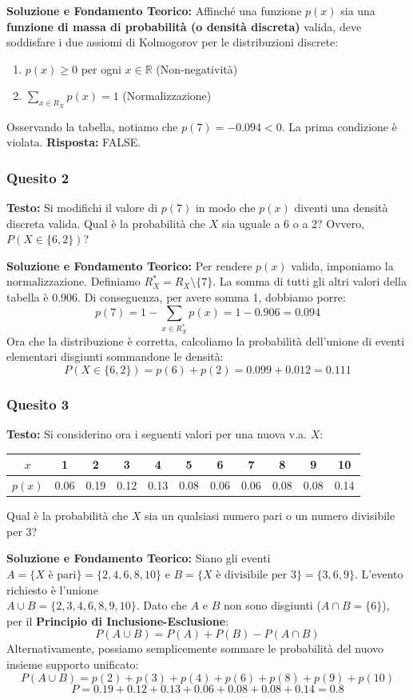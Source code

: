 \documentclass[12pt, a4paper]{article}
\begin{document}
\textbf{Soluzione e Fondamento Teorico:} 
Affinché una funzione $p(x)$ sia una \textbf{funzione di massa di probabilità (o densità discreta)} valida, deve soddisfare i due assiomi di Kolmogorov per le distribuzioni discrete:
\begin{enumerate}
    \item $p(x) \ge 0$ per ogni $x \in \mathbb{R}$ (Non-negatività)
    \item $\sum_{x \in R_X} p(x) = 1$ (Normalizzazione)
\end{enumerate}
Osservando la tabella, notiamo che $p(7) = -0.094 < 0$. La prima condizione è violata.
\textbf{Risposta:} FALSE.

\subsubsection*{Quesito 2}
\textbf{Testo:} Si modifichi il valore di $p(7)$ in modo che $p(x)$ diventi una densità discreta valida. Qual è la probabilità che $X$ sia uguale a 6 o a 2? Ovvero, $P(X \in \{6,2\})$?

\textbf{Soluzione e Fondamento Teorico:} 
Per rendere $p(x)$ valida, imponiamo la normalizzazione. Definiamo $R^*_X = R_X \setminus \{7\}$. La somma di tutti gli altri valori della tabella è $0.906$. Di conseguenza, per avere somma 1, dobbiamo porre:
$$ p(7) = 1 - \sum_{x \in R^*_X} p(x) = 1 - 0.906 = 0.094 $$
Ora che la distribuzione è corretta, calcoliamo la probabilità dell'unione di eventi elementari disgiunti sommandone le densità:
$$ P(X \in \{6,2\}) = p(6) + p(2) = 0.099 + 0.012 = 0.111 $$

\subsubsection*{Quesito 3}
\textbf{Testo:} Si considerino ora i seguenti valori per una nuova v.a. $X$:
\begin{center}
\begin{tabular}{c|cccccccccc}
\toprule
$x$ & 1 & 2 & 3 & 4 & 5 & 6 & 7 & 8 & 9 & 10 \\
\midrule
$p(x)$ & 0.06 & 0.19 & 0.12 & 0.13 & 0.08 & 0.06 & 0.06 & 0.08 & 0.08 & 0.14 \\
\bottomrule
\end{tabular}
\end{center}
Qual è la probabilità che $X$ sia un qualsiasi numero pari o un numero divisibile per 3?

\textbf{Soluzione e Fondamento Teorico:} 
Siano gli eventi $A = \{X \text{ è pari}\} = \{2,4,6,8,10\}$ e $B = \{X \text{ è divisibile per 3}\} = \{3,6,9\}$.
L'evento richiesto è l'unione \\ $A \cup B = \{2,3,4,6,8,9,10\}$. Dato che $A$ e $B$ non sono disgiunti ($A \cap B = \{6\}$), per il \textbf{Principio di Inclusione-Esclusione}:
$$ P(A \cup B) = P(A) + P(B) - P(A \cap B) $$
Alternativamente, possiamo semplicemente sommare le probabilità del nuovo insieme supporto unificato:
$$ P(A \cup B) = p(2)+p(3)+p(4)+p(6)+p(8)+p(9)+p(10) $$
$$ P = 0.19 + 0.12 + 0.13 + 0.06 + 0.08 + 0.08 + 0.14 = 0.8 $$
\end{document}
